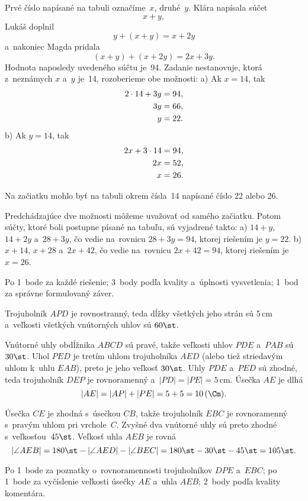 {%
Prvé číslo napísané na tabuli označíme~$x$, druhé~$y$.
Klára napísala súčet
$$
x+y,
$$
Lukáš doplnil
$$
y+(x+y)=x+2y
$$
a~nakoniec Magda pridala
$$
(x+y)+(x+2y)=2x+3y.
$$
Hodnota naposledy uvedeného súčtu je~94.
Zadanie nestanovuje, ktorá z~neznámych $x$ a~$y$ je~14, rozoberieme obe možnosti:
\ite a) Ak $x=14$, tak
$$
\aligned
2\cdot 14+3y&=94,\\
3y&=66,\\
y&=22.
\endaligned
$$
\ite b) Ak $y=14$, tak %
$$
\aligned
2x+3\cdot 14&=94,\\
2x&=52,\\
x&=26.
\endaligned
$$

Na začiatku mohlo byť na tabuli okrem čísla~14 napísané číslo 22 alebo 26.

\poznamka
Predchádzajúce dve možnosti môžeme uvažovať od samého začiatku.
Potom súčty, ktoré boli postupne písané na tabuľu, sú vyjadrené takto:
\ite a) $14+y$, $14+2y$ a~$28+3y$, čo vedie na~rovnicu $28+3y=94$, ktorej riešením je $y=22$.
\ite b) $x+14$, $x+28$ a~$2x+42$, čo vedie na~rovnicu $2x+42=94$, ktorej riešením je $x=26$.

\hodnotenie
Po 1~bode za každé riešenie;
3~body podľa kvality a~úplnosti vysvetlenia;
1~bod za správne formulovaný záver.
\endhodnotenie
}

{%
Trojuholník $APD$ je rovnostranný, teda dĺžky všetkých jeho strán sú 5\,cm a~veľkosti všetkých vnútorných uhlov sú $60\st$.

Vnútorné uhly obdĺžnika $ABCD$ sú pravé, takže veľkosti uhlov $PDE$ a~$PAB$ sú~$30\st$.
Uhol $PED$ je tretím uhlom trojuholníka $AED$ (alebo tiež striedavým uhlom k~uhlu $EAB$), preto je jeho veľkosť $30\st$.
Uhly $PDE$ a~$PED$ sú zhodné, teda trojuholník $DEP$ je rovnoramenný a~$|PD|=|PE|=5$\,cm.
Úsečka $AE$ je dlhá
$$
|AE|=|AP|+|PE|=5+5=10\,(\Cm).
$$

Úsečka $CE$ je zhodná s~úsečkou $CB$, takže trojuholník $EBC$ je rovnoramenný
s~pravým uhlom pri vrchole~$C$.
Zvyšné dva vnútorné uhly sú preto zhodné s~veľkosťou~$45\st$.
Veľkosť uhla $AEB$ je rovná
$$
|\angle AEB|=180\st-|\angle AED|-|\angle BEC|=180\st-30\st-45\st=105\st.
$$
%


\hodnotenie
Po 1~bode za poznatky o~rovnoramennosti trojuholníkov $DPE$ a~$EBC$;
po 1~bode za vyčíslenie veľkosti úsečky $AE$ a~uhla $AEB$;
2~body podľa kvality komentára.
\endhodnotenie
}

